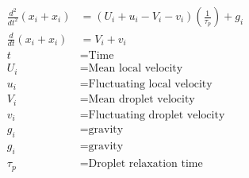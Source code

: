 \documentclass[fleqn, oneside, 11pt]{article}
\begin{document}
\begin{preview}
\begin{align*}
\frac{d^{2}}{dt^{2}}\left(x_{i}+x_{i}\right) & = \left(U_{i} + u_{i} - V_{i} - v_{i}\right)\left(\frac{1}{\tau_{p}}\right)+g_{i} \nonumber \\
\frac{d}{dt}\left(x_{i}+x_{i}\right) & = V_{i} + v_{i} \nonumber \\
t & =  \text{Time} \nonumber \\
U_{i} & =  \text{Mean local velocity} \nonumber \\
u_{i} & =  \text{Fluctuating local velocity} \nonumber \\
V_{i} & =  \text{Mean droplet velocity} \nonumber \\
v_{i} & =  \text{Fluctuating droplet velocity} \nonumber \\
g_{i} & =  \text{gravity} \nonumber \\
g_{i} & =  \text{gravity} \nonumber \\
\tau_{p} & = \text{Droplet relaxation time} \nonumber \\
\end{align*} 
\end{preview}
\end{document}
